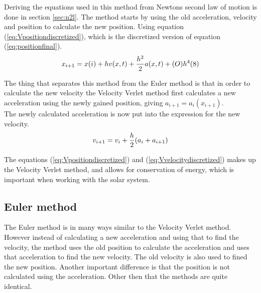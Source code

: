 \documentclass{article}
\begin{document}
    Deriving the equations used in this method from Newtons second law of motion is done in section \ref{sec:n2l}. The method starts by using the old acceleration, velocity and position to calculate the new position. Using equation (\ref{eq:Vpositiondiscretized}), which is the discretized version of equation (\ref{eq:positionfinal}). \\

    \begin{equation}    \label{eq:Vpositiondiscretized}
        x_{i+1} = x(i) + h v(x,t) + \frac{h^{2}}{2} a(x,t) + (O)h^{4} (8)\\
    \end{equation}

    The thing that separates this method from the Euler method is that in order to calculate the new velocity the Velocity Verlet method first calculates a new acceleration using the newly gained position, giving $a_{i+1} = a_i (x_{i+1})$. \\

    The newly calculated acceleration is now put into the expression for the new velocity. \\

    \begin{equation}    \label{eq:Vvelocitydiscretized}
        v_{i+1} = v_i + \frac{h}{2} (a_i+a_{i+1})  \\
    \end{equation}

    The equations (\ref{eq:Vpositiondiscretized}) and (\ref{eq:Vvelocitydiscretized}) makes up the Velocity Verlet method, and allows for conservation of energy, which is important when working with the solar system. \\

\subsection{Euler method}

    The Euler method is in many ways similar to the Velocity Verlet method. However instead of calculating a new acceleration and using that to find the velocity, the method uses the old position to calculate the acceleration and uses that acceleration to find the new velocity. The old velocity is also used to fined the new position. Another important difference is that the position is not calculated using the acceleration. Other then that the methods are quite identical. \\
\end{document}
